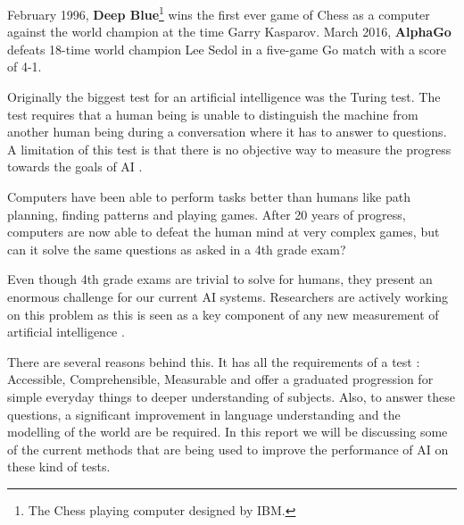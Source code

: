 February 1996, \textbf{Deep Blue}\footnote{The Chess playing computer designed by IBM.} wins the first ever game of Chess as a computer against the world champion at the time Garry Kasparov.
March 2016, \textbf{AlphaGo} defeats 18-time world champion Lee Sedol in a five-game Go match with a score of 4-1.

Originally the biggest test for an artificial intelligence was the Turing test.
The test requires that a human being is unable to distinguish the machine from another human being during a conversation where it has to answer to questions.
A limitation of this test is that there is no objective way to measure the progress towards the goals of AI \cite{honorstudent}.

Computers have been able to perform tasks better than humans like path planning, finding patterns and playing games. After 20 years of progress, computers are now able to defeat the human mind at very complex games, but can it solve the same questions as asked in a 4th grade exam?

Even though 4th grade exams are trivial to solve for humans, they present an enormous challenge for our current AI systems. Researchers are actively working on this problem as this is seen as a key component of any new measurement of artificial intelligence \cite{honorstudent}.

There are several reasons behind this.
It has all the requirements of a test \cite{honorstudent}: Accessible, Comprehensible, Measurable and offer a graduated progression for simple everyday things to deeper understanding of subjects.
Also, to answer these questions, a significant improvement in language understanding and the modelling of the world are be required. In this report we will be discussing some of the current methods that are being used to improve the performance of AI on these kind of tests.